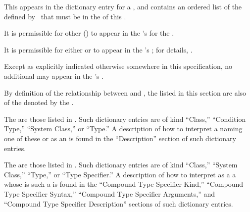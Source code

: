 \endsubsubsection%


This appears in the dictionary entry for a ,
and contains an ordered list of the  defined 
by \clisp\ that must be in the  of this .

It is permissible for other () 
to appear in the 's  for the .

It is permissible for 
  either 
      or 
to appear in the 's ;
for details, \seesection\TypeRelationships.

Except as explicitly indicated otherwise somewhere in this specification,
no additional   may appear in 
the 's .

By definition of the relationship between  and ,
the  listed in this section are also  of 
the  denoted by the .

\endsubsubsection%


The  are those  
listed in \figref\StandardizedAtomicTypeSpecs.
Such dictionary entries are of kind 
``Class,'' ``Condition Type,'' ``System Class,'' or ``Type.''
A description of how to interpret 
a  naming one of these  or  
as an 
is found in the ``Description'' section of such dictionary entries.

The  are those  
listed in \figref\StandardizedCompoundTypeSpecNames.
Such dictionary entries are of kind ``Class,'' ``System Class,''
``Type,'' or ``Type Specifier.''
A description of how to interpret as a 
a  whose  is such a 
is found in the 
     ``Compound Type Specifier Kind,''
     ``Compound Type Specifier Syntax,''
     ``Compound Type Specifier Arguments,''
 and ``Compound Type Specifier Description''
sections of such dictionary entries.

